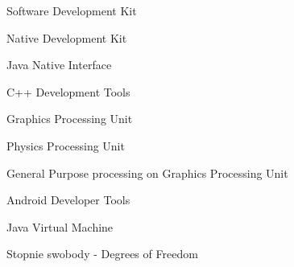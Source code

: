 \suppressfloats[t]

\begin{description}[\setleftmargin{65pt}\setlabelstyle{\bfseries}]
    \leftskip=1cm

	\item[$SDK$]      	Software Development Kit
    \item[$NDK$]      	Native Development Kit
    \item[$JNI$]      	Java Native Interface
    \item[$CDT$]        C++ Development Tools
    \item[$GPU$]		Graphics Processing Unit
    \item[$PPU$]        Physics Processing Unit
    \item[$GPGPU$]      General Purpose processing on Graphics Processing Unit
    \item[$ADT$]        Android Developer Tools
    \item[$JVM$]        Java Virtual Machine
    \item[$DoF$]        Stopnie swobody - Degrees of Freedom
\end{description}
